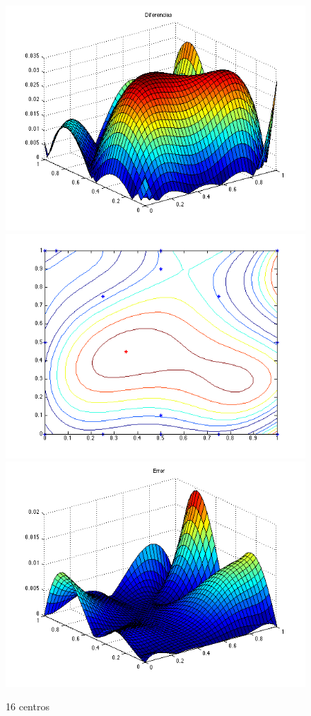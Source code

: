 \documentclass[11pt,a4paper]{article}
\begin{document}
\begin{figure}[H]
\centering

\includegraphics[scale=0.35]{diferencias16.png}
\includegraphics[scale=0.4]{centros16.png}
\includegraphics[scale=0.4]{error16.png}
\caption{16 centros}
\end{figure}
\end{document}
